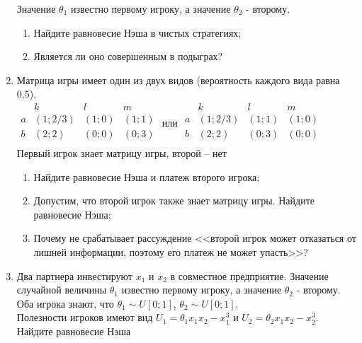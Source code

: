 \documentclass[pdftex,12pt,a4paper]{article}
\begin{document}
\begin{enumerate}
Значение $\theta _1 $ известно первому игроку, а значение $\theta _2 $ - второму.
\begin{enumerate}
\item Найдите равновесие Нэша в чистых стратегиях; 
\item Является ли оно совершенным в подыграх? 
\end{enumerate}


\item Матрица игры имеет один из двух видов (вероятность каждого вида равна 0,5).\\ 
$\begin{array}{c|ccc}
    {} &  k & l & m   \\
\hline
    a &  {\left( 1;2/3 \right)} & {\left( {1;0} \right)} & {\left( {1;1} \right)}   \\
    b &  {\left( {2;2} \right)} & {\left( {0;0} \right)} & {\left( {0;3} \right)}   \\
\end{array}$
 или $\begin{array}{c|ccc}
    {} &  k & l & m   \\
\hline
    a &  (1;2/3) & {\left( {1;1} \right)} & {\left( {1;0} \right)}   \\
    b &  {\left( {2;2} \right)} & {\left( {0;3} \right)} & {\left( {0;0} \right)}   \\
\end{array}$\\
Первый игрок знает матрицу игры, второй – нет
\begin{enumerate}
\item Найдите равновесие Нэша и платеж второго игрока;
\item Допустим, что второй игрок также знает матрицу игры. Найдите равновесие Нэша;
\item Почему не срабатывает рассуждение <<второй игрок может отказаться от лишней информации,  поэтому его платеж не может упасть>>?
\end{enumerate}

\item Два партнера инвестируют $x_1 $ и $x_2 $ в совместное предприятие. Значение случайной величины  $\theta _1 $ известно первому игроку, а значение $\theta _2 $ - второму. Оба игрока знают, что $\theta _1  \sim U\left[ {0;1} \right]$, $\theta _2  \sim U\left[ {0;1} \right]$.\\
Полезности игроков имеют вид $U_1  = \theta _1 x_1 x_2  - x_1^3 $ и $U_2  = \theta _2 x_1 x_2  - x_2^3 $.\\
Найдите равновесие Нэша 


\end{enumerate}
\end{document}
